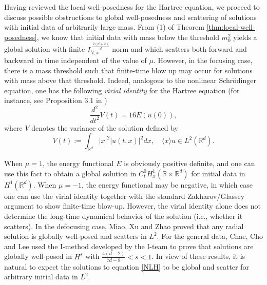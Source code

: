 \documentclass[reqno,11pt]{amsart}
\theoremstyle{plain}
\theoremstyle{definition}
\numberwithin{equation}{section}
\numberwithin{theorem}{section}
\begin{document}
Having reviewed the local well-posedness for the Hartree equation, we proceed to discuss possible obstructions to global well-posedness and scattering of solutions with initial data of arbitrarily large mass. From (1) of Theorem \ref{thm:local-well-posedness}, we know that initial data with mass below the threshold $m_0^2$ yields a global solution with finite $L_{t,x}^{\frac{2(d+2)}{d}}$ norm and which scatters both forward and backward in time independent of the value of $\mu$. However, in the focusing case, there is a mass threshold such that finite-time blow up may occur for solutions with mass above that threshold. Indeed, analogous to the nonlinear Schr\"odinger equation, one has the following \emph{virial identity} for the Hartree equation (for instance, see Proposition 3.1 in \cite{MiaoXuZhaoblowup})
\[
\frac{d^2}{dt^2} V(t) = 16E(u(0)),
\]
where $V$ denotes the variance of the solution defined by
\[
V(t) := \int_{\mathbb{R}^d} |x|^2 |u(t,x)|^2 dx, \quad \langle x \rangle u \in L^2(\mathbb{R}^d).
\]

When $\mu = 1$, the energy functional $E$ is obviously positive definite, and one can use this fact to obtain a global solution in $C_t^0 H_x^1(\mathbb{R} \times \mathbb{R}^d)$ for initial data in $H^1(\mathbb{R}^d)$. When $\mu = -1$, the energy functional may be negative, in which case one can use the virial identity together with the standard Zakharov/Glassey argument to show finite-time blow-up. However, the virial identity alone does not determine the long-time dynamical behavior of the solution (i.e., whether it scatters). In the defocusing case, Miao, Xu and Zhao \cite{MXZ-JMPA} proved that any radial solution is globally well-posed and scatters in $L^2$. For the general  data, Chae, Cho and Lee \cite{CCS} used the I-method developed by the I-team \cite{Iteam} to prove that solutions are globally well-posed  in $H^{s}$ with $\frac{4(d-2)}{7d-8}<s<1$. In view of these results, it is natural to expect the solutions to equation \eqref{NLH} to be global and scatter for arbitrary initial data in $L^2$.
\end{document}
